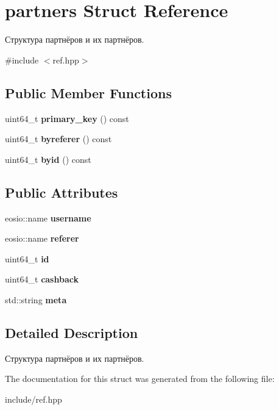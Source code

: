 \hypertarget{structpartners}{}\section{partners Struct Reference}
\label{structpartners}


Структура партнёров и их партнёров.  




{\ttfamily \#include $<$ref.\+hpp$>$}

\subsection*{Public Member Functions}
\begin{DoxyCompactItemize}
\item 
\mbox{\label{structpartners_a9af4a38e8888c6fff93efd9e3af54a80}} 
uint64\+\_\+t {\bfseries primary\+\_\+key} () const
\item 
\mbox{\label{structpartners_a5c93fa6c916a5d7be0d5185fca2a8c5f}} 
uint64\+\_\+t {\bfseries byreferer} () const
\item 
\mbox{\label{structpartners_a71d7d1a136d33832fc916154084cb57b}} 
uint64\+\_\+t {\bfseries byid} () const
\end{DoxyCompactItemize}
\subsection*{Public Attributes}
\begin{DoxyCompactItemize}
\item 
\mbox{\label{structpartners_ac9be1c3c2c5f7b81fbe8acfa2f76e858}} 
eosio\+::name {\bfseries username}
\item 
\mbox{\label{structpartners_a44bf256aa55e6f8c17800a3160714143}} 
eosio\+::name {\bfseries referer}
\item 
\mbox{\label{structpartners_aaf49127e21e0eda009bd7bd338d1c6e1}} 
uint64\+\_\+t {\bfseries id}
\item 
\mbox{\label{structpartners_a2d4df9210e42767611ce8004daed8572}} 
uint64\+\_\+t {\bfseries cashback}
\item 
\mbox{\label{structpartners_ab35f8626187f53e9b60e017fc5b7a511}} 
std\+::string {\bfseries meta}
\end{DoxyCompactItemize}


\subsection{Detailed Description}
Структура партнёров и их партнёров. 

The documentation for this struct was generated from the following file\+:\begin{DoxyCompactItemize}
\item 
include/ref.\+hpp\end{DoxyCompactItemize}
